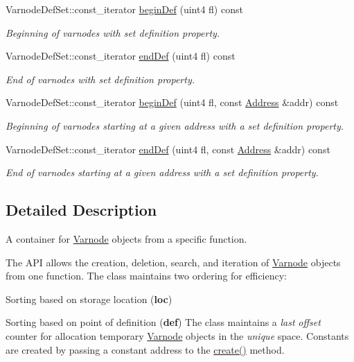 \begin{DoxyCompactItemize}
Varnode\+Def\+Set\+::const\+\_\+iterator \mbox{\hyperlink{class_varnode_bank_a64420e8511a793ca45128d54a5766f03}{begin\+Def}} (uint4 fl) const
\begin{DoxyCompactList}\small\item\em Beginning of varnodes with set definition property. \end{DoxyCompactList}\item 
Varnode\+Def\+Set\+::const\+\_\+iterator \mbox{\hyperlink{class_varnode_bank_a84936e0c795704467a7de83f5a83582d}{end\+Def}} (uint4 fl) const
\begin{DoxyCompactList}\small\item\em End of varnodes with set definition property. \end{DoxyCompactList}\item 
Varnode\+Def\+Set\+::const\+\_\+iterator \mbox{\hyperlink{class_varnode_bank_a657f9d8a88aa678d39ec1ba3691647eb}{begin\+Def}} (uint4 fl, const \mbox{\hyperlink{class_address}{Address}} \&addr) const
\begin{DoxyCompactList}\small\item\em Beginning of varnodes starting at a given address with a set definition property. \end{DoxyCompactList}\item 
Varnode\+Def\+Set\+::const\+\_\+iterator \mbox{\hyperlink{class_varnode_bank_a5b7c4e02a9a82a7a98e6555383f1ccb3}{end\+Def}} (uint4 fl, const \mbox{\hyperlink{class_address}{Address}} \&addr) const
\begin{DoxyCompactList}\small\item\em End of varnodes starting at a given address with a set definition property. \end{DoxyCompactList}\end{DoxyCompactItemize}


\subsection{Detailed Description}
A container for \mbox{\hyperlink{class_varnode}{Varnode}} objects from a specific function. 

The A\+PI allows the creation, deletion, search, and iteration of \mbox{\hyperlink{class_varnode}{Varnode}} objects from one function. The class maintains two ordering for efficiency\+:
\begin{DoxyItemize}
\item Sorting based on storage location ({\bfseries{loc}})
\item Sorting based on point of definition ({\bfseries{def}}) The class maintains a {\itshape last} {\itshape offset} counter for allocation temporary \mbox{\hyperlink{class_varnode}{Varnode}} objects in the {\itshape unique} space. Constants are created by passing a constant address to the \mbox{\hyperlink{class_varnode_bank_ae2effd128dce9205fba1015b45959f1c}{create()}} method. 
\end{DoxyItemize}

